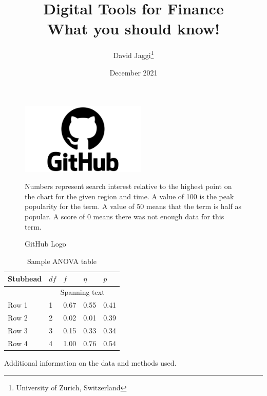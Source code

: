 \documentclass[10pt,a4paper]{article}
\title{%
  Digital Tools for Finance \\
  \large What you should know!}
\author{David Jaggi\thanks{University of Zurich, Switzerland}}
\date{December 2021}
\begin{document}
\maketitle
\begin{abstract}
    \blindtext
\end{abstract}
\newpage
\blindtext[3]
\textcite{gormsenCoronavirusImpactStock2020}
\begin{figure}[h!]%
    \centering
    \includegraphics[width=6cm]{text/paper/github_logo.png}%
    \caption{GitHub Logo}%
    \footnotesize Numbers represent search interest relative to the highest point on the chart for the given region and time. A value of 100 is the peak popularity for the term. A value of 50 means that the term is half as popular. A score of 0 means there was not enough data for this term.
    \label{fig:github_logo}%
\end{figure}
\blindtext[3]
\textcite{kozlowskiTailThatWags2020}
\begin{table}
    \centering  
  \begin{threeparttable}
    \caption{Sample ANOVA table}
     \begin{tabular}{lllll}
        \toprule
        Stubhead & \( df \) & \( f \) & \( \eta \) & \( p \) \\
        \midrule
                 &     \multicolumn{4}{c}{Spanning text}     \\
        Row 1    & 1        & 0.67    & 0.55       & 0.41    \\
        Row 2    & 2        & 0.02    & 0.01       & 0.39    \\
        Row 3    & 3        & 0.15    & 0.33       & 0.34    \\
        Row 4    & 4        & 1.00    & 0.76       & 0.54    \\
        \bottomrule
     \end{tabular}
    \begin{tablenotes}
      \small
      \item Additional information on the data and methods used.
    \end{tablenotes}
  \end{threeparttable}
\end{table}
\blindtext[4]
\printbibliography
\end{document}
